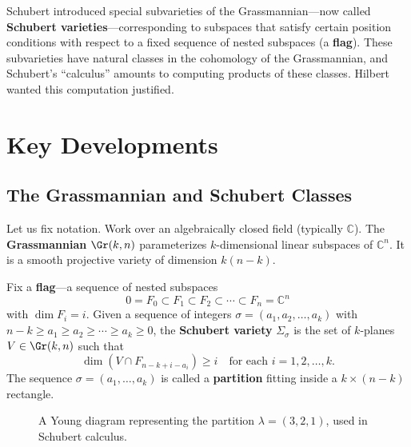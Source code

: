 Schubert introduced special subvarieties of the Grassmannian---now called \textbf{Schubert varieties}---corresponding to subspaces that satisfy certain position conditions with respect to a fixed sequence of nested subspaces (a \textbf{flag}). These subvarieties have natural classes in the cohomology of the Grassmannian, and Schubert's ``calculus'' amounts to computing products of these classes. Hilbert wanted this computation justified.

\section{Key Developments}

\subsection{The Grassmannian and Schubert Classes}

Let us fix notation. Work over an algebraically closed field (typically $\mathbb{C}$). The \textbf{Grassmannian} $\Gr(k, n)$ parameterizes $k$-dimensional linear subspaces of $\mathbb{C}^n$. It is a smooth projective variety of dimension $k(n-k)$.

\begin{definition}
Fix a \textbf{flag}---a sequence of nested subspaces
\[
    0 = F_0 \subset F_1 \subset F_2 \subset \cdots \subset F_n = \mathbb{C}^n
\]
with $\dim F_i = i$. Given a sequence of integers $\sigma = (a_1, a_2, \ldots, a_k)$ with $n - k \geq a_1 \geq a_2 \geq \cdots \geq a_k \geq 0$, the \textbf{Schubert variety} $\Sigma_\sigma$ is the set of $k$-planes $V \in \Gr(k, n)$ such that
\[
    \dim(V \cap F_{n - k + i - a_i}) \geq i \quad \text{for each } i = 1, 2, \ldots, k.
\]
The sequence $\sigma = (a_1, \ldots, a_k)$ is called a \textbf{partition} fitting inside a $k \times (n-k)$ rectangle.
\end{definition}

\begin{figure}[htbp]
\centering
{}
\caption{A Young diagram representing the partition $\lambda = (3,2,1)$, used in Schubert calculus.}
\label{fig:young-diagram}
\end{figure}

